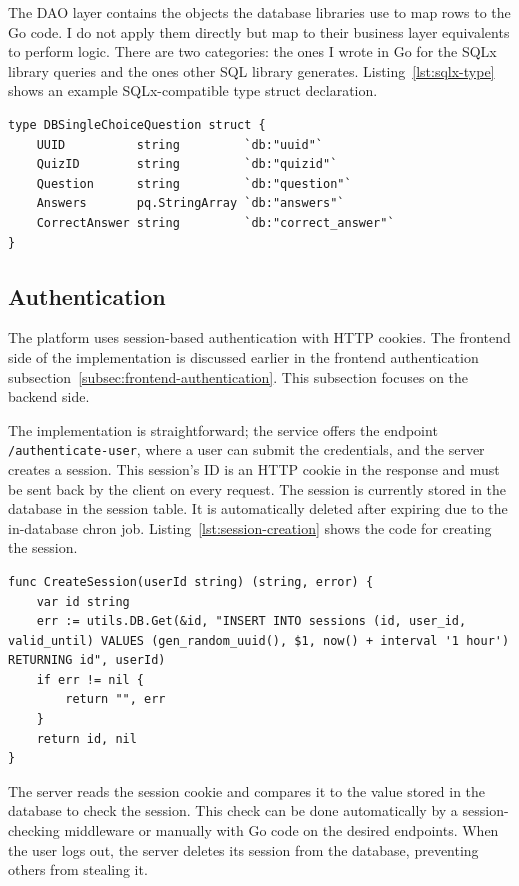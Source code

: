The DAO layer contains the objects the database libraries use to map rows to the Go code. I do not apply them directly but map to their business layer equivalents to perform logic. There are two categories: the ones I wrote in Go for the SQLx library queries and the ones other SQL library generates. Listing~\ref{lst:sqlx-type} shows an example SQLx-compatible type struct declaration.

\begin{lstlisting}[caption=SQLx-compatible type struct declaration,label=lst:sqlx-type]
type DBSingleChoiceQuestion struct {
    UUID          string         `db:"uuid"`
    QuizID        string         `db:"quizid"`
    Question      string         `db:"question"`
    Answers       pq.StringArray `db:"answers"`
    CorrectAnswer string         `db:"correct_answer"`
}
\end{lstlisting}

\subsection{Authentication}

The platform uses session-based authentication with HTTP cookies. The frontend side of the implementation is discussed earlier in the frontend authentication subsection~\ref{subsec:frontend-authentication}. This subsection focuses on the backend side.

The implementation is straightforward; the service offers the endpoint \texttt{/authenticate-user}, where a user can submit the credentials, and the server creates a session. This session's ID is an HTTP cookie in the response and must be sent back by the client on every request. The session is currently stored in the database in the session table. It is automatically deleted after expiring due to the in-database chron job. Listing~\ref{lst:session-creation} shows the code for creating the session.

\begin{lstlisting}[caption=Session creation code,label=lst:session-creation]
func CreateSession(userId string) (string, error) {
	var id string
	err := utils.DB.Get(&id, "INSERT INTO sessions (id, user_id, valid_until) VALUES (gen_random_uuid(), $1, now() + interval '1 hour') RETURNING id", userId)
	if err != nil {
		return "", err
	}
	return id, nil
}
\end{lstlisting}

The server reads the session cookie and compares it to the value stored in the database to check the session. This check can be done automatically by a session-checking middleware or manually with Go code on the desired endpoints. When the user logs out, the server deletes its session from the database, preventing others from stealing it.

